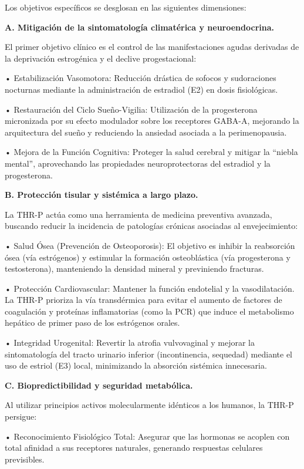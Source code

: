 \documentclass[
  spanish,
]{article}
\begin{document}
Los objetivos específicos se desglosan en las siguientes dimensiones:

\textbf{A. Mitigación de la sintomatología climatérica y neuroendocrina.}

El primer objetivo clínico es el control de las manifestaciones agudas derivadas de la deprivación estrogénica y el declive progestacional:

• Estabilización Vasomotora: Reducción drástica de sofocos y sudoraciones nocturnas mediante la administración de estradiol (E2) en dosis fisiológicas.

• Restauración del Ciclo Sueño-Vigilia: Utilización de la progesterona micronizada por su efecto modulador sobre los receptores GABA-A, mejorando la arquitectura del sueño y reduciendo la ansiedad asociada a la perimenopausia.

• Mejora de la Función Cognitiva: Proteger la salud cerebral y mitigar la ``niebla mental'', aprovechando las propiedades neuroprotectoras del estradiol y la progesterona.

\textbf{B. Protección tisular y sistémica a largo plazo.}

La THR-P actúa como una herramienta de medicina preventiva avanzada, buscando reducir la incidencia de patologías crónicas asociadas al envejecimiento:

• Salud Ósea (Prevención de Osteoporosis): El objetivo es inhibir la reabsorción ósea (vía estrógenos) y estimular la formación osteoblástica (vía progesterona y testosterona), manteniendo la densidad mineral y previniendo fracturas.

• Protección Cardiovascular: Mantener la función endotelial y la vasodilatación. La THR-P prioriza la vía transdérmica para evitar el aumento de factores de coagulación y proteínas inflamatorias (como la PCR) que induce el metabolismo hepático de primer paso de los estrógenos orales.

• Integridad Urogenital: Revertir la atrofia vulvovaginal y mejorar la sintomatología del tracto urinario inferior (incontinencia, sequedad) mediante el uso de estriol (E3) local, minimizando la absorción sistémica innecesaria.

\textbf{C. Biopredictibilidad y seguridad metabólica.}

Al utilizar principios activos molecularmente idénticos a los humanos, la THR-P persigue:

• Reconocimiento Fisiológico Total: Asegurar que las hormonas se acoplen con total afinidad a sus receptores naturales, generando respuestas celulares previsibles.
\end{document}
